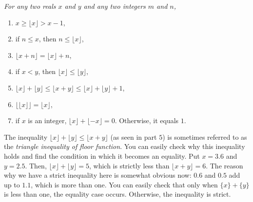 \documentclass[12pt]{subfile}
\begin{document}
        \begin{proposition}\slshape \label{prop:floor}
        	For any two reals $x$ and $y$ and any two integers $m$ and $n$,
        	\begin{enumerate}[1.]
        		\item $x\geq\lfloor x\rfloor>x-1$,
        		\item if $n \leq x$, then $n \leq \lfloor x \rfloor$,
        		\item $\lfloor x+n\rfloor=\lfloor x\rfloor+n$,
        		\item if $x <y$, then $\lfloor x \rfloor \leq \lfloor y \rfloor$,
        		\item $\lfloor x\rfloor+\lfloor y \rfloor\leq \lfloor x+y\rfloor \leq \lfloor x\rfloor+\lfloor y\rfloor+1$,
        		\item $\lfloor \lfloor x\rfloor\rfloor  =  \lfloor x\rfloor$,
        		\item if $x$ is an integer, $\lfloor x\rfloor+\lfloor -x\rfloor=0$. Otherwise, it equals $1$.
        	\end{enumerate}
        \end{proposition}

        \begin{example}
        	The inequality $\lfloor x\rfloor+\lfloor y\rfloor \leq \lfloor x+y\rfloor$ (as seen in part $5$) is sometimes referred to as the \textit{triangle inequality of floor function}. You can easily check why this inequality holds and find the condition in which it becomes an equality. Put $x=3.6$ and $y=2.5$. Then, $\lfloor x\rfloor+\lfloor y\rfloor = 5$, which is strictly less than $\lfloor x+y\rfloor=6$. The reason why we have a strict inequality here is somewhat obvious now: $0.6$ and $0.5$ add up to $1.1$, which is more than one. You can easily check that only when $\{x\} + \{y\}$ is less than one, the equality case occurs. Otherwise, the inequality is strict.
        \end{example}
\end{document}
